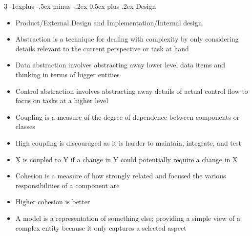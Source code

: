 \documentclass[10pt, landscape]{article}
\makeatletter
\renewcommand{\section}{\@startsection{section}{1}{0mm}%
                                {-1ex plus -.5ex minus -.2ex}%
                                {0.5ex plus .2ex}%
                                {\normalfont\large\bfseries}}
\renewcommand{\section}{\@startsection{section}{2}{0mm}%
                                {-1explus -.5ex minus -.2ex}%
                                {0.5ex plus .2ex}%
                                {\normalfont\normalsize\bfseries}}
\makeatother
\begin{document}
\begin{multicols*}{3}
\section{Design}
\begin{itemize}
    \item Product/External Design and Implementation/Internal design
    \item Abstraction is a technique for dealing with complexity by only considering details relevant to the current perspective or task at hand
    \item Data abstraction involves abstracting away lower level data items and thinking in terms of bigger entities
    \item Control abstraction involves abstracting away details of actual control flow to focus on tasks at a higher level
    \item Coupling is a measure of the degree of dependence between components or classes
    \item High coupling is discouraged as it is harder to maintain, integrate, and test
    \item X is coupled to Y if a change in Y could potentially require a change in X
    \item Cohesion is a measure of how strongly related and focused the various responsibilities of a component are
    \item Higher cohesion is better
    \item A model is a representation of something else; providing a simple view of a complex entity because it only captures a selected aspect
\end{itemize}


\end{multicols*}
\end{document}
